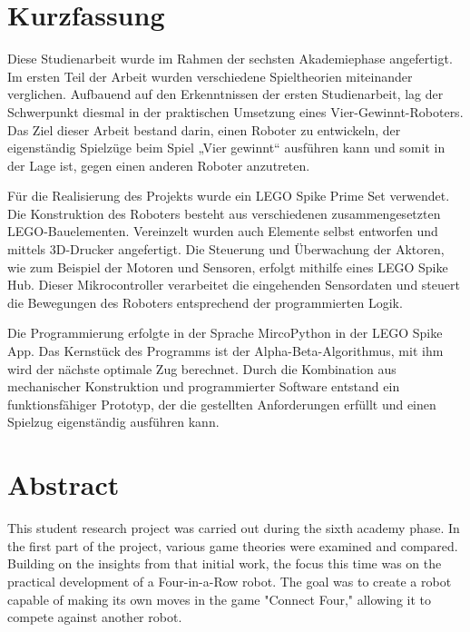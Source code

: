 \chapter*{Kurzfassung} %

%
%
%
 

Diese Studienarbeit wurde im Rahmen der sechsten Akademiephase angefertigt. Im ersten Teil der Arbeit wurden verschiedene Spieltheorien miteinander verglichen.
Aufbauend auf den Erkenntnissen der ersten Studienarbeit, lag der Schwerpunkt diesmal in der praktischen Umsetzung eines Vier-Gewinnt-Roboters. Das Ziel dieser Arbeit bestand darin, einen Roboter zu entwickeln, der eigenständig Spielzüge beim Spiel „Vier gewinnt“ ausführen kann und somit in der Lage ist, gegen einen anderen Roboter anzutreten.

Für die Realisierung des Projekts wurde ein LEGO Spike Prime Set verwendet. Die Konstruktion des Roboters besteht aus verschiedenen zusammengesetzten LEGO-Bauelementen. Vereinzelt wurden auch Elemente selbst entworfen und mittels 3D-Drucker angefertigt.  
Die Steuerung und Überwachung der Aktoren, wie zum Beispiel der Motoren und Sensoren, erfolgt mithilfe eines LEGO Spike Hub. Dieser Mikrocontroller verarbeitet die eingehenden Sensordaten und steuert die Bewegungen des Roboters entsprechend der programmierten Logik.

Die Programmierung erfolgte in der Sprache MircoPython in der LEGO Spike App.
Das Kernstück des Programms ist der Alpha-Beta-Algorithmus, mit ihm wird der nächste optimale Zug berechnet.
Durch die Kombination aus mechanischer Konstruktion und programmierter Software entstand ein funktionsfähiger Prototyp, der die gestellten Anforderungen erfüllt und einen Spielzug eigenständig ausführen kann.

\clearpage

\chapter*{Abstract} %

This student research project was carried out during the sixth academy phase. In the first part of the project, various game theories were examined and compared. Building on the insights from that initial work, the focus this time was on the practical development of a Four-in-a-Row robot. The goal was to create a robot capable of making its own moves in the game "Connect Four," allowing it to compete against another robot.

